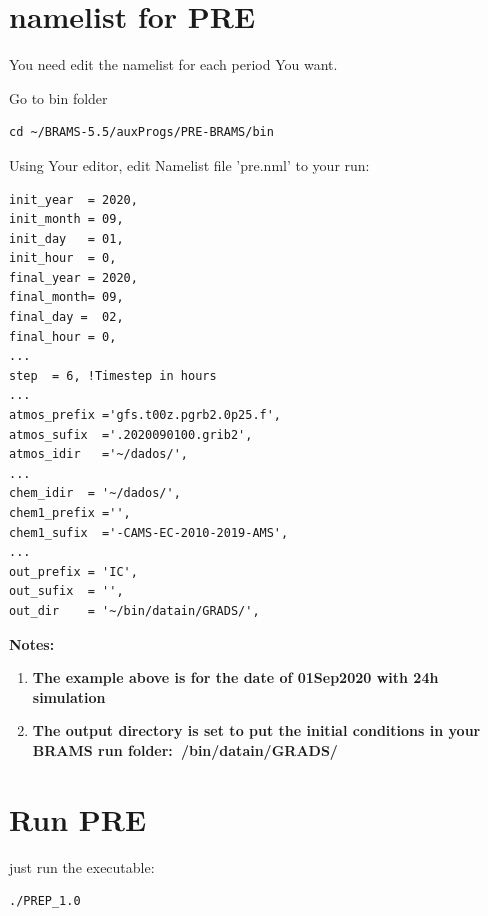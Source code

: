 \documentclass{article}
\begin{document}
\section{namelist for PRE}

You need edit the namelist for each period You want.

Go to bin folder

\begin{verbatim}
cd ~/BRAMS-5.5/auxProgs/PRE-BRAMS/bin
\end{verbatim}

Using Your editor, edit Namelist file 'pre.nml' to your run:

\begin{verbatim}
init_year  = 2020,
init_month = 09,
init_day   = 01,
init_hour  = 0,
final_year = 2020,
final_month= 09,
final_day =  02,
final_hour = 0,
...
step  = 6, !Timestep in hours
...
atmos_prefix ='gfs.t00z.pgrb2.0p25.f',
atmos_sufix  ='.2020090100.grib2',
atmos_idir   ='~/dados/',
...
chem_idir  = '~/dados/',
chem1_prefix ='',
chem1_sufix  ='-CAMS-EC-2010-2019-AMS',
...
out_prefix = 'IC',
out_sufix  = '',
out_dir    = '~/bin/datain/GRADS/',
\end{verbatim}

\textbf{Notes:}
\begin{enumerate}
	\item \textbf{The example above is for the date of 01Sep2020 with 24h simulation}
	\item \textbf{The output directory is set to put the initial conditions in your BRAMS run folder:~/bin/datain/GRADS/ }
\end{enumerate}

\section{Run PRE}

just run the executable:

\begin{verbatim}
./PREP_1.0
\end{verbatim}
\end{document}
